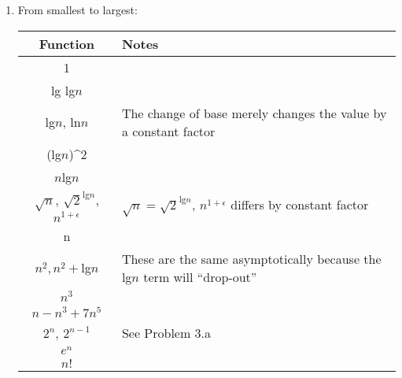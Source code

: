 \documentclass[12pt,letterpaper]{article}
\begin{document}
\begin{enumerate}
\begin{enumerate}
        \item
          From smallest to largest:

          \begin{tabular}{c | l}
            Function & Notes \\
            \hline
            1 \\
            lg lg$n$ \\
            lg$n$, ln$n$ & The change of base merely changes the value by a constant factor \\
            (lg$n$)^2 \\
            $n$lg$n$ \\
            $\sqrt{n}$, $\sqrt{2}^{\text{lg}n}$, $n^{1+\epsilon}$ & $\sqrt{n} = \sqrt{2}^{\text{lg}n}$, $n^{1+\epsilon}$ differs by  constant factor \\
            n \\
            $n^2, n^2 + $lg$n$ & These are the same asymptotically because the lg$n$ term will ``drop-out'' \\
            $n^3$ \\
            $n - n^3 + 7n^5$ \\
            $2^n$, $2^{n-1}$ & See Problem 3.a \\
            $e^n$ \\
            $n!$
          \end{tabular}
      \end{enumerate}
  \end{enumerate}
\end{document}
